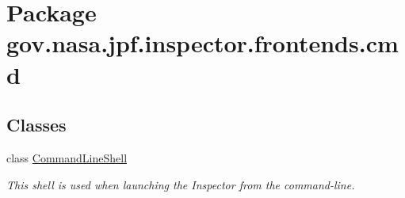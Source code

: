 \hypertarget{namespacegov_1_1nasa_1_1jpf_1_1inspector_1_1frontends_1_1cmd}{}\section{Package gov.\+nasa.\+jpf.\+inspector.\+frontends.\+cmd}
\label{namespacegov_1_1nasa_1_1jpf_1_1inspector_1_1frontends_1_1cmd}
\subsection*{Classes}
\begin{DoxyCompactItemize}
\item 
class \hyperlink{classgov_1_1nasa_1_1jpf_1_1inspector_1_1frontends_1_1cmd_1_1_command_line_shell}{Command\+Line\+Shell}
\begin{DoxyCompactList}\small\item\em This shell is used when launching the Inspector from the command-\/line. \end{DoxyCompactList}\end{DoxyCompactItemize}
